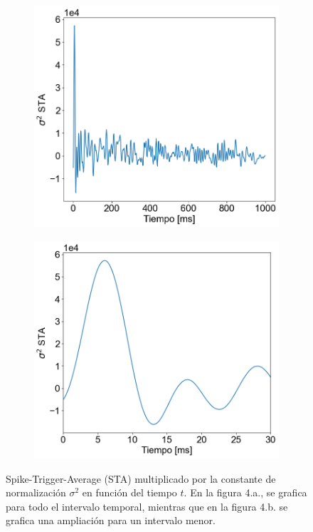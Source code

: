 \documentclass[aps,prb,twocolumn,superscriptaddress,floatfix,longbibliography]{revtex4-2}
\newcounter{para}
\begin{document}
\begin{figure}[h]
  \centering
  \begin{subfigure}[b]{0.35\textwidth}
      \centering
      \includegraphics[width=\textwidth]{STA_total.png}
      \caption{\label{fig:STA_total}}
      \end{subfigure}
  \hfill
  \begin{subfigure}[b]{0.35\textwidth}
      \centering
      \includegraphics[width=\textwidth]{STA_parcial.png}
      \caption{\label{fig:STA_parcial}}
  \end{subfigure}
     \caption{Spike-Trigger-Average (STA) multiplicado por la constante de normalización $\sigma^2$ en función del tiempo $t$. En la figura 4.a., se grafica para todo el intervalo temporal, mientras que en la figura 4.b. se grafica una ampliación para un intervalo menor.}
     \label{fig:STA}
\end{figure}
\end{document}
